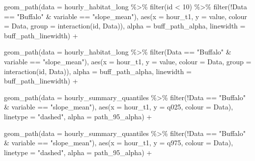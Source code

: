 \documentclass[
  letterpaper,
  DIV=11,
  numbers=noendperiod]{scrartcl}
\newenvironment{Shaded}{\begin{snugshade}}{\end{snugshade}}
\newcommand{\AttributeTok}[1]{\textcolor[rgb]{0.40,0.45,0.13}{#1}}
\newcommand{\DecValTok}[1]{\textcolor[rgb]{0.68,0.00,0.00}{#1}}
\newcommand{\FunctionTok}[1]{\textcolor[rgb]{0.28,0.35,0.67}{#1}}
\newcommand{\NormalTok}[1]{\textcolor[rgb]{0.00,0.23,0.31}{#1}}
\newcommand{\SpecialCharTok}[1]{\textcolor[rgb]{0.37,0.37,0.37}{#1}}
\newcommand{\StringTok}[1]{\textcolor[rgb]{0.13,0.47,0.30}{#1}}
\begin{document}
\begin{Shaded}
\begin{Highlighting}[]
  \FunctionTok{geom\_path}\NormalTok{(}\AttributeTok{data =}\NormalTok{ hourly\_habitat\_long }\SpecialCharTok{\%\textgreater{}\%} \FunctionTok{filter}\NormalTok{(id }\SpecialCharTok{\textless{}} \DecValTok{10}\NormalTok{) }\SpecialCharTok{\%\textgreater{}\%} 
              \FunctionTok{filter}\NormalTok{(}\SpecialCharTok{!}\NormalTok{Data }\SpecialCharTok{==} \StringTok{"Buffalo"} \SpecialCharTok{\&}\NormalTok{ variable }\SpecialCharTok{==} \StringTok{"slope\_mean"}\NormalTok{),}
                 \FunctionTok{aes}\NormalTok{(}\AttributeTok{x =}\NormalTok{ hour\_t1, }\AttributeTok{y =}\NormalTok{ value, }\AttributeTok{colour =}\NormalTok{ Data, }\AttributeTok{group =} \FunctionTok{interaction}\NormalTok{(id, Data)),}
                 \AttributeTok{alpha =}\NormalTok{ buff\_path\_alpha,}
              \AttributeTok{linewidth =}\NormalTok{ buff\_path\_linewidth) }\SpecialCharTok{+}
  
  \FunctionTok{geom\_path}\NormalTok{(}\AttributeTok{data =}\NormalTok{ hourly\_habitat\_long }\SpecialCharTok{\%\textgreater{}\%} 
              \FunctionTok{filter}\NormalTok{(Data }\SpecialCharTok{==} \StringTok{"Buffalo"} \SpecialCharTok{\&}\NormalTok{ variable }\SpecialCharTok{==} \StringTok{"slope\_mean"}\NormalTok{), }
                 \FunctionTok{aes}\NormalTok{(}\AttributeTok{x =}\NormalTok{ hour\_t1, }\AttributeTok{y =}\NormalTok{ value, }\AttributeTok{colour =}\NormalTok{ Data, }\AttributeTok{group =} \FunctionTok{interaction}\NormalTok{(id, Data)), }
                 \AttributeTok{alpha =}\NormalTok{ buff\_path\_alpha,}
              \AttributeTok{linewidth =}\NormalTok{ buff\_path\_linewidth) }\SpecialCharTok{+}

  \FunctionTok{geom\_path}\NormalTok{(}\AttributeTok{data =}\NormalTok{ hourly\_summary\_quantiles }\SpecialCharTok{\%\textgreater{}\%} 
              \FunctionTok{filter}\NormalTok{(}\SpecialCharTok{!}\NormalTok{Data }\SpecialCharTok{==} \StringTok{"Buffalo"} \SpecialCharTok{\&}\NormalTok{ variable }\SpecialCharTok{==} \StringTok{"slope\_mean"}\NormalTok{),}
              \FunctionTok{aes}\NormalTok{(}\AttributeTok{x =}\NormalTok{ hour\_t1, }\AttributeTok{y =}\NormalTok{ q025, }\AttributeTok{colour =}\NormalTok{ Data),}
            \AttributeTok{linetype =} \StringTok{"dashed"}\NormalTok{,}
              \AttributeTok{alpha =}\NormalTok{ path\_95\_alpha) }\SpecialCharTok{+}

  \FunctionTok{geom\_path}\NormalTok{(}\AttributeTok{data =}\NormalTok{ hourly\_summary\_quantiles }\SpecialCharTok{\%\textgreater{}\%} 
              \FunctionTok{filter}\NormalTok{(}\SpecialCharTok{!}\NormalTok{Data }\SpecialCharTok{==} \StringTok{"Buffalo"} \SpecialCharTok{\&}\NormalTok{ variable }\SpecialCharTok{==} \StringTok{"slope\_mean"}\NormalTok{),}
              \FunctionTok{aes}\NormalTok{(}\AttributeTok{x =}\NormalTok{ hour\_t1, }\AttributeTok{y =}\NormalTok{ q975, }\AttributeTok{colour =}\NormalTok{ Data),}
            \AttributeTok{linetype =} \StringTok{"dashed"}\NormalTok{,}
              \AttributeTok{alpha =}\NormalTok{ path\_95\_alpha) }\SpecialCharTok{+}
  

\end{Highlighting}
\end{Shaded}
\end{document}

